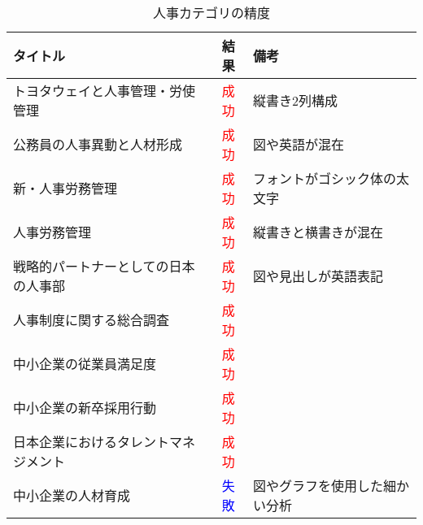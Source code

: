\begin{table}[h]
  \label{tab:doc_human}
  \begin{center}
  \begin{tabular}{|l|c|l|}
    \hline
    \textbf{タイトル} & \textbf{結果} & \textbf{備考} \\ \hline
    トヨタウェイと人事管理・労使管理 & \textcolor{red}{成功} & 縦書き2列構成 \\ \hline
    公務員の人事異動と人材形成 & \textcolor{red}{成功} & 図や英語が混在 \\ \hline
    新・人事労務管理 & \textcolor{red}{成功} & フォントがゴシック体の太文字 \\ \hline
    人事労務管理 & \textcolor{red}{成功} & 縦書きと横書きが混在 \\ \hline
    戦略的パートナーとしての日本の人事部 & \textcolor{red}{成功} & 図や見出しが英語表記 \\ \hline
    人事制度に関する総合調査 & \textcolor{red}{成功} & \\ \hline
    中小企業の従業員満足度 & \textcolor{red}{成功} & \\ \hline
    中小企業の新卒採用行動 & \textcolor{red}{成功} & \\ \hline
    日本企業におけるタレントマネジメント & \textcolor{red}{成功} & \\ \hline
    中小企業の人材育成 & \textcolor{blue}{失敗} & 図やグラフを使用した細かい分析 \\ \hline
  \end{tabular}
  \end{center}
  \caption{人事カテゴリの精度}
\end{table}

\clearpage

